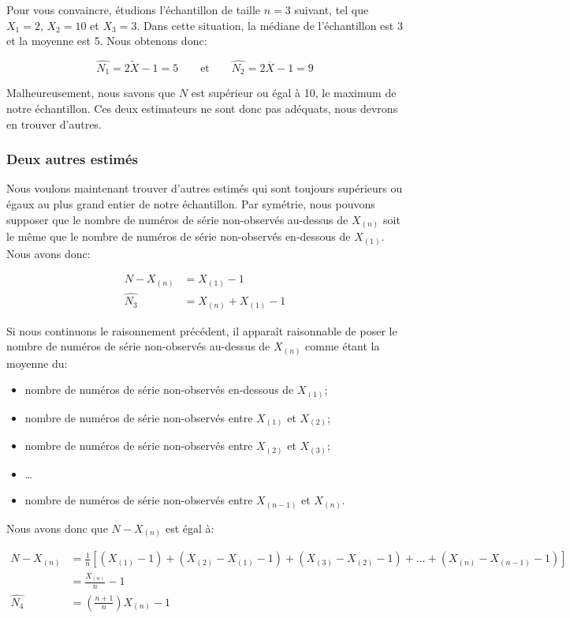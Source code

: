 \documentclass[10pt]{article}
\begin{document}
Pour vous convaincre, étudions l'échantillon de taille \(n=3\) suivant,
tel que \(X_1=2\), \(X_2=10\) et \(X_3=3\). Dans cette situation, la
médiane de l'échantillon est 3 et la moyenne est 5. Nous obtenons donc:

\[\widehat{N_1}=2\widetilde{X}-1=5 \qquad \text{et} \qquad \widehat{N_2}=2\overline{X}-1=9 \]

Malheureusement, nous savons que \(N\) est supérieur ou égal à 10, le
maximum de notre échantillon. Ces deux estimateurs ne sont donc pas
adéquats, nous devrons en trouver d'autres.

\hypertarget{deux-autres-estimes}{%
\subsubsection{Deux autres estimés}\label{deux-autres-estimes}}

Nous voulons maintenant trouver d'autres estimés qui sont toujours
supérieurs ou égaux au plus grand entier de notre échantillon. Par
symétrie, nous pouvons supposer que le nombre de numéros de série
non-observés au-dessus de \(X_{(n)}\) soit le même que le nombre de
numéros de série non-observés en-dessous de \(X_{(1)}\). Nous avons
donc:

\begin{align*}
N-X_{(n)} &= X_{(1)}-1 \\
\widehat{N_3} &= X_{(n)}+X_{(1)}-1
\end{align*}

Si nous continuons le raisonnement précédent, il apparaît raisonnable de
poser le nombre de numéros de série non-observés au-dessus de
\(X_{(n)}\) comme étant la moyenne du:

\begin{itemize}
\item
  nombre de numéros de série non-observés en-dessous de \(X_{(1)}\);
\item
  nombre de numéros de série non-observés entre \(X_{(1)}\) et
  \(X_{(2)}\);
\item
  nombre de numéros de série non-observés entre \(X_{(2)}\) et
  \(X_{(3)}\);
\item
  \ldots{}
\item
  nombre de numéros de série non-observés entre \(X_{(n-1)}\) et
  \(X_{(n)}\).
\end{itemize}

Nous avons donc que \(N-X_{(n)}\) est égal à:

\begin{align*}
N-X_{(n)} &= \frac{1}{n}\left[ (X_{(1)}-1)+(X_{(2)}-X_{(1)}-1)+(X_{(3)}-X_{(2)}-1)+\ldots+(X_{(n)}-X_{(n-1)}-1) \right] \\
&= \frac{X_{(n)}}{n}-1 \\
\widehat{N_4} &= \left( \frac{n+1}{n}\right) X_{(n)}-1
\end{align*}
\end{document}
